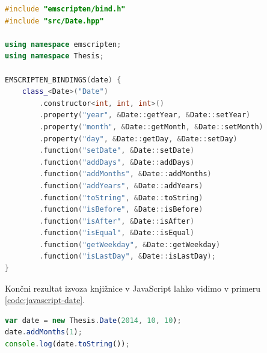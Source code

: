 \begin{lstlisting}[caption={C++ koda za izvoz funckionalnosti knjižnice v JavaScript razreda \texttt{Date}.}, label=code:emscripten-bindings, language=c++]
#include "emscripten/bind.h"
#include "src/Date.hpp"

using namespace emscripten;
using namespace Thesis;

EMSCRIPTEN_BINDINGS(date) {
    class_<Date>("Date")
        .constructor<int, int, int>()
        .property("year", &Date::getYear, &Date::setYear)
        .property("month", &Date::getMonth, &Date::setMonth)
        .property("day", &Date::getDay, &Date::setDay)
        .function("setDate", &Date::setDate)
        .function("addDays", &Date::addDays)
        .function("addMonths", &Date::addMonths)
        .function("addYears", &Date::addYears)
        .function("toString", &Date::toString)
        .function("isBefore", &Date::isBefore)
        .function("isAfter", &Date::isAfter)
        .function("isEqual", &Date::isEqual)
        .function("getWeekday", &Date::getWeekday)
        .function("isLastDay", &Date::isLastDay);
}
\end{lstlisting}

Končni rezultat izvoza knjižnice v JavaScript lahko vidimo v primeru \ref{code:javascript-date}.

\begin{lstlisting}[caption={Primer uporabe izvoženega razreda \texttt{Date} v JavaScript.}, label=code:javascript-date, language=JavaScript]
var date = new Thesis.Date(2014, 10, 10);
date.addMonths(1);
console.log(date.toString());
\end{lstlisting}